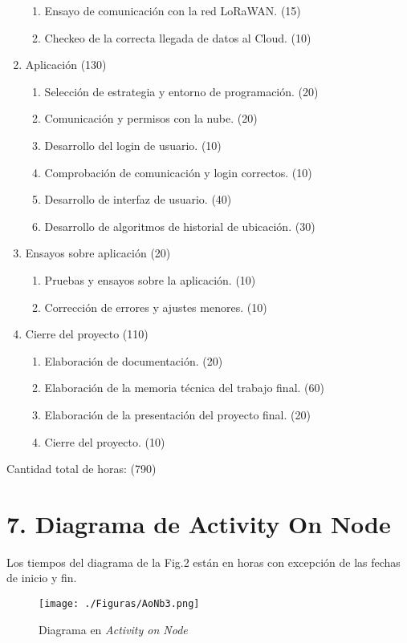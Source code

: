 \documentclass[11pt]{charter}
\begin{document}
\begin{enumerate}
\begin{enumerate}
	\item Ensayo de comunicación con la red LoRaWAN. (15)
	\item Checkeo de la correcta llegada de datos al Cloud. (10)
	\end{enumerate}
\item Aplicación (130)
	\begin{enumerate}
	\item Selección de estrategia y entorno de programación. (20)
	\item Comunicación y permisos con la nube. (20)
	\item Desarrollo del login de usuario. (10)
	\item Comprobación de comunicación y login correctos. (10)
    \item Desarrollo de interfaz de usuario. (40)
	\item Desarrollo de algoritmos de historial de ubicación. (30)
	\end{enumerate}
\item Ensayos sobre aplicación (20)
	\begin{enumerate}
	\item Pruebas y ensayos sobre la aplicación. (10)
	\item Corrección de errores y ajustes menores. (10)
	\end{enumerate}
\item Cierre del proyecto (110)
	\begin{enumerate}
	\item Elaboración de documentación. (20)
	\item Elaboración de la memoria técnica del trabajo final. (60) 
	\item Elaboración de la presentación del proyecto final. (20)
	\item Cierre del proyecto. (10)
	\end{enumerate}
\end{enumerate}

Cantidad total de horas: (790)
 


\section{7. Diagrama de Activity On Node}
\label{sec:AoN}

Los tiempos del diagrama de la Fig.2 están en horas con excepción de las fechas de inicio y fin.

\begin{figure}[htpb]
\centering 
\texttt{[image: ./Figuras/AoNb3.png]}
\caption{Diagrama en \textit{Activity on Node}}
\label{fig:AoN}
\end{figure}
\end{document}
